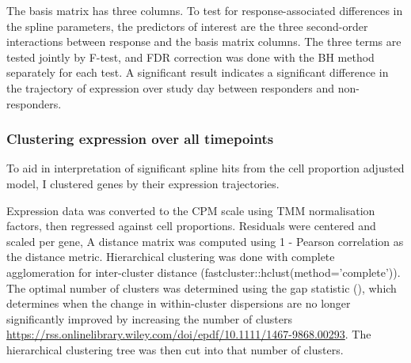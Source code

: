 \begin{outline}
The basis matrix has three columns. \autocite{perperoglou2019ReviewSplineFunction}
To test for response-associated differences in the spline parameters, the predictors of interest are the three second-order interactions between response and the basis matrix columns. 
The three terms are tested jointly by F-test, and \gls{FDR} correction was done with the \gls{BH} method separately for each test.
A significant result indicates a significant difference in the trajectory of expression over study day between responders and non-responders.

\subsubsection{Clustering expression over all timepoints}

To aid in interpretation of significant spline hits from the cell proportion adjusted model, I clustered genes by their expression trajectories.

Expression data was converted to the \gls{CPM} scale using \gls{TMM} normalisation factors, then regressed against cell proportions.
Residuals were centered and scaled per gene, 
A distance matrix was computed using 1 - Pearson correlation as the distance metric.
Hierarchical clustering was done with complete agglomeration for inter-cluster distance (fastcluster::hclust(method='complete')).
The optimal number of clusters was determined using the gap statistic (),
which determines when the change in within-cluster dispersions are no longer significantly improved by increasing the number of clusters \url{https://rss.onlinelibrary.wiley.com/doi/epdf/10.1111/1467-9868.00293}.
The hierarchical clustering tree was then cut into that number of clusters.


\end{outline}
